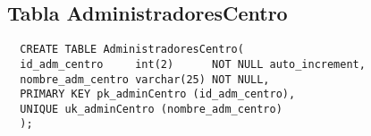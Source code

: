\subsection{Tabla AdministradoresCentro}

\begin{verbatim}
  CREATE TABLE AdministradoresCentro(
  id_adm_centro     int(2)      NOT NULL auto_increment,
  nombre_adm_centro varchar(25) NOT NULL,
  PRIMARY KEY pk_adminCentro (id_adm_centro),
  UNIQUE uk_adminCentro (nombre_adm_centro)
  );
\end{verbatim}